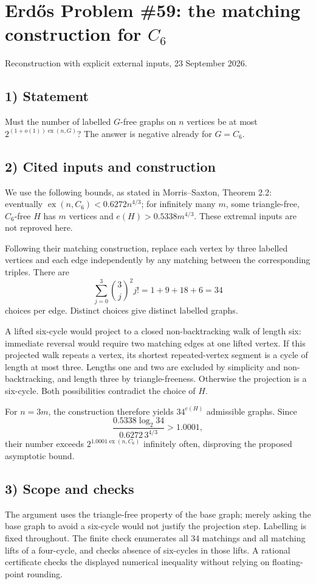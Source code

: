\section{Erd\H{o}s Problem \#59: the matching construction for $C_6$}
\noindent Reconstruction with explicit external inputs, 23 September 2026.

\subsection*{1) Statement}
Must the number of labelled $G$-free graphs on $n$ vertices be at most $2^{(1+o(1))\operatorname{ex}(n,G)}$? The answer is negative already for $G=C_6$.

\subsection*{2) Cited inputs and construction}
We use the following bounds, as stated in Morris--Saxton, Theorem 2.2: eventually $\operatorname{ex}(n,C_6)<0.6272n^{4/3}$; for infinitely many $m$, some triangle-free, $C_6$-free $H$ has $m$ vertices and $e(H)>0.5338m^{4/3}$. These extremal inputs are not reproved here.

Following their matching construction, replace each vertex by three labelled vertices and each edge independently by any matching between the corresponding triples. There are
\[
 \sum_{j=0}^3\binom3j^2j!=1+9+18+6=34
\]
choices per edge. Distinct choices give distinct labelled graphs.

A lifted six-cycle would project to a closed non-backtracking walk of length six: immediate reversal would require two matching edges at one lifted vertex. If this projected walk repeats a vertex, its shortest repeated-vertex segment is a cycle of length at most three. Lengths one and two are excluded by simplicity and non-backtracking, and length three by triangle-freeness. Otherwise the projection is a six-cycle. Both possibilities contradict the choice of $H$.

For $n=3m$, the construction therefore yields $34^{e(H)}$ admissible graphs. Since
\[
 \frac{0.5338\log_2 34}{0.6272\,3^{4/3}}>1.0001,
\]
their number exceeds $2^{1.0001\operatorname{ex}(n,C_6)}$ infinitely often, disproving the proposed asymptotic bound.

\subsection*{3) Scope and checks}
The argument uses the triangle-free property of the base graph; merely asking the base graph to avoid a six-cycle would not justify the projection step. Labelling is fixed throughout. The finite check enumerates all 34 matchings and all matching lifts of a four-cycle, and checks absence of six-cycles in those lifts. A rational certificate checks the displayed numerical inequality without relying on floating-point rounding.

